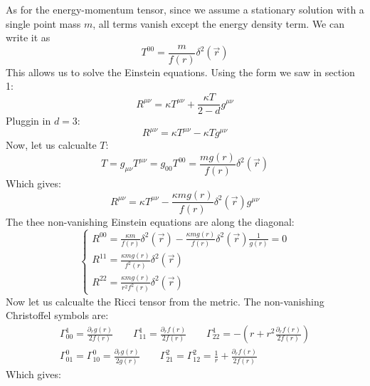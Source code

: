 \documentclass{article}
\begin{document}
As for the energy-momentum tensor, since we assume a stationary solution with a single point mass $m$, all terms vanish except the energy density term. We can write it as
\begin{equation}
    T^{00} = \frac{m}{f(r)}\delta^2(\vec{r})
\end{equation}
This allows us to solve the Einstein equations. Using the form we saw in section 1:
\begin{equation}
    R^{\mu\nu} = \kappa T^{\mu\nu} + \frac{\kappa T}{2 - d}g^{\mu\nu}
\end{equation}
Pluggin in $d = 3$:
\begin{equation}
    R^{\mu\nu} = \kappa T^{\mu\nu} - \kappa Tg^{\mu\nu}
\end{equation}
Now, let us calcualte $T$:
\begin{equation}
    T = g_{\mu\nu}T^{\mu\nu} = g_{00}T^{00} = \frac{mg(r)}{f(r)}\delta^2(\vec{r})
\end{equation}
Which gives:
\begin{equation}
    R^{\mu\nu} = \kappa T^{\mu\nu} - \frac{\kappa mg(r)}{f(r)}\delta^2(\vec{r})g^{\mu\nu}
\end{equation}
The thee non-vanishing Einstein equations are along the diagonal:
\begin{equation}
\begin{cases}
    R^{00} = \frac{\kappa m}{f(r)}\delta^2(\vec{r}) - \frac{\kappa mg(r)}{f(r)}\delta^2(\vec{r})\frac{1}{g(r)} = 0
    \\
    R^{11} = \frac{\kappa mg(r)}{f^2(r)}\delta^2(\vec{r})
    \\
    R^{22} = \frac{\kappa mg(r)}{r^2f^2(r)}\delta^2(\vec{r})
\end{cases}
\end{equation}
Now let us calcualte the Ricci tensor from the metric. The non-vanishing Christoffel symbols are:
\begin{equation}
\begin{gathered}
    \Gamma^1_{00} = \frac{\partial_{r}g(r)}{2f(r)}
    \qquad
    \Gamma^1_{11} = \frac{\partial_r f(r)}{2f(r)}
    \qquad
    \Gamma^1_{22} = -\left(r + r^2\frac{\partial_{r}f(r)}{2f(r)}\right)
    \\
    \Gamma^0_{01} = \Gamma^0_{10} = \frac{\partial_{r}g(r)}{2g(r)}
    \qquad
    \Gamma^2_{21} = \Gamma^2_{12} = \frac{1}{r} + \frac{\partial_r f(r)}{2f(r)}
\end{gathered}
\end{equation}
Which gives:
\end{document}
